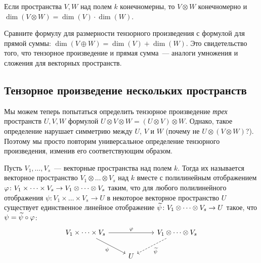 \begin{corollary}
Если пространства $V,W$ над полем $k$ конечномерны, то $V\otimes W$
конечномерно и $\dim(V\otimes W) = \dim(V)\cdot\dim(W)$.
\end{corollary}

\begin{remark}
Сравните формулу для размерности тензорного произведения с формулой
для прямой суммы: $\dim(V\oplus W) = \dim(V) + \dim(W)$. Это
свидетельство того, что тензорное произведение и прямая сумма~---
аналоги умножения и сложения для векторных пространств.
\end{remark}

\subsection{Тензорное произведение нескольких пространств}


Мы можем теперь попытаться определить тензорное произведение
{\it трех} пространств $U,V,W$ формулой $U\otimes V\otimes W =
(U\otimes V)\otimes W$. Однако, такое определение нарушает симметрию
между $U$, $V$ и $W$ (почему не $U\otimes (V\otimes W)$?). Поэтому мы
просто повторим универсальное определение тензорного произведения,
изменив его соответствующим образом.

Пусть $V_1,\dots,V_s$~--- векторные пространства над полем $k$. Тогда
их 
называется векторное пространство $V_1\otimes\dots\otimes V_s$ над $k$
вместе с полилинейным отображением
$\varphi\colon V_1\times\dots\times V_s\to V_1\otimes\dots\otimes V_s$
таким, что для любого полилинейного отображения
$\psi\colon V_1\times\dots\times V_s\to U$ в некоторое векторное
пространство $U$ существует единственное линейное отображение
$\widetilde\psi\colon V_1\otimes\dots\otimes V_s\to U$ такое,
что $\psi = \widetilde\psi\circ\varphi$:
$$
\begin{tikzcd}
V_1\times\dots\times V_s \arrow{rr}{\ph} \arrow{rd}[swap]{\psi}
& & V_1 \otimes\dots\otimes V_s \arrow[dashed]{ld}{\tld\psi} \\
& U
\end{tikzcd}
$$

